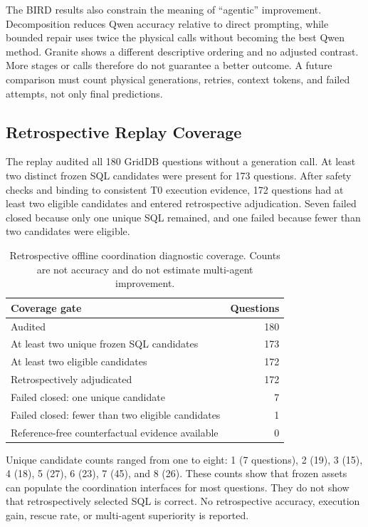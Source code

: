 \documentclass[applsci,article,submit,moreauthors]{Definitions/mdpi}
\begin{document}
The BIRD results also constrain the meaning of ``agentic'' improvement. Decomposition reduces Qwen accuracy relative to direct prompting, while bounded repair uses twice the physical calls without becoming the best Qwen method. Granite shows a different descriptive ordering and no adjusted contrast. More stages or calls therefore do not guarantee a better outcome. A future comparison must count physical generations, retries, context tokens, and failed attempts, not only final predictions.

\subsection{Retrospective Replay Coverage}

The replay audited all 180 GridDB questions without a generation call. At least two distinct frozen SQL candidates were present for 173 questions. After safety checks and binding to consistent T0 execution evidence, 172 questions had at least two eligible candidates and entered retrospective adjudication. Seven failed closed because only one unique SQL remained, and one failed because fewer than two candidates were eligible.

\begin{table}[htbp]
\caption{Retrospective offline coordination diagnostic coverage. Counts are not accuracy and do not estimate multi-agent improvement.}
\label{tab:replay}
\centering
\begin{tabular}{lr}
\toprule
Coverage gate & Questions\\
\midrule
Audited & 180\\
At least two unique frozen SQL candidates & 173\\
At least two eligible candidates & 172\\
Retrospectively adjudicated & 172\\
Failed closed: one unique candidate & 7\\
Failed closed: fewer than two eligible candidates & 1\\
Reference-free counterfactual evidence available & 0\\
\bottomrule
\end{tabular}
\end{table}

Unique candidate counts ranged from one to eight: 1 (7 questions), 2 (19), 3 (15), 4 (18), 5 (27), 6 (23), 7 (45), and 8 (26). These counts show that frozen assets can populate the coordination interfaces for most questions. They do not show that retrospectively selected SQL is correct. No retrospective accuracy, execution gain, rescue rate, or multi-agent superiority is reported.
\end{document}
